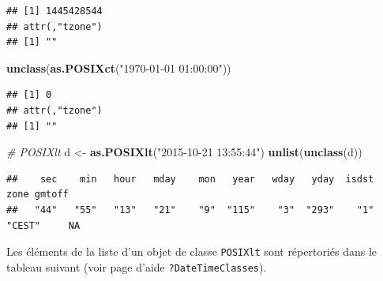 \documentclass[
  11pt,
]{book}
\newenvironment{Shaded}{\begin{snugshade}}{\end{snugshade}}
\newcommand{\CommentTok}[1]{\textcolor[rgb]{0.56,0.35,0.01}{\textit{#1}}}
\newcommand{\KeywordTok}[1]{\textcolor[rgb]{0.13,0.29,0.53}{\textbf{#1}}}
\newcommand{\NormalTok}[1]{#1}
\newcommand{\StringTok}[1]{\textcolor[rgb]{0.31,0.60,0.02}{#1}}
\numberwithin{equation}{section}
\numberwithin{countremarque}{section}
\begin{document}
\begin{lstlisting}
## [1] 1445428544
## attr(,"tzone")
## [1] ""
\end{lstlisting}

\begin{Shaded}
\begin{Highlighting}[]
\KeywordTok{unclass}\NormalTok{(}\KeywordTok{as.POSIXct}\NormalTok{(}\StringTok{"1970{-}01{-}01 01:00:00"}\NormalTok{))}
\end{Highlighting}
\end{Shaded}

\begin{lstlisting}
## [1] 0
## attr(,"tzone")
## [1] ""
\end{lstlisting}

\begin{Shaded}
\begin{Highlighting}[]
\CommentTok{\# POSIXlt}
\NormalTok{d \textless{}{-}}\StringTok{ }\KeywordTok{as.POSIXlt}\NormalTok{(}\StringTok{"2015{-}10{-}21 13:55:44"}\NormalTok{)}
\KeywordTok{unlist}\NormalTok{(}\KeywordTok{unclass}\NormalTok{(d))}
\end{Highlighting}
\end{Shaded}

\begin{lstlisting}
##    sec    min   hour   mday    mon   year   wday   yday  isdst   zone gmtoff 
##   "44"   "55"   "13"   "21"    "9"  "115"    "3"  "293"    "1" "CEST"     NA
\end{lstlisting}

Les éléments de la liste d'un objet de classe \texttt{POSIXlt} sont répertoriés dans le tableau suivant (voir page d'aide \texttt{?DateTimeClasses}).
\end{document}
